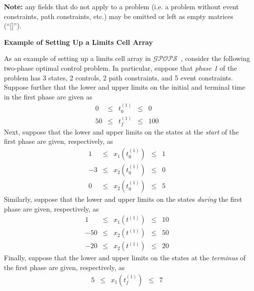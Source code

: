 \documentclass[10pt,final]{report}
\newcommand{\gpops}{$\mathcal{GPOPS}$~}
\newcounter{example}[chapter]
\newenvironment{shadedframe}{%
  \def\FrameCommand{\fcolorbox{black}{shadecolor}}%
  \MakeFramed {\FrameRestore}}
{\endMakeFramed}
\begin{document}
{\noindent}{\bf Note:} any fields that do not apply to a problem (i.e. a problem without event constraints, path constraints, etc.) may be omitted or left as empty matrices (``[]'').

\begin{shadedframe}
{\noindent}{\bf Example of Setting Up a Limits Cell Array}
\vspace{12pt}

As an example of setting up a limits cell array in \gpops,
consider the following two-phase optimal control problem.  In
particular, suppose that {\em phase 1} of the problem has 3 states, 2
controls, 2 path constraints, and 5 event constraints.  Suppose
further that the lower and upper limits on the initial and terminal
time in the first phase are given as
\begin{displaymath}
  \begin{array}{rcccr}
    0 & \leq  & t_0^{(1)} & \leq & 0 \\
    50 & \leq & t_f^{(1)} & \leq & 100
  \end{array}
\end{displaymath}
Next, suppose that the lower and upper limits on the states at the
{\em start} of the first phase are given, respectively, as
\begin{displaymath}
  \begin{array}{rcccr}
    1 & \leq & x_1(t_0^{(1)}) & \leq & 1 \\
    -3 & \leq & x_2(t_0^{(1)}) & \leq & 0 \\
    0 & \leq & x_2(t_0^{(1)}) & \leq & 5
  \end{array}
\end{displaymath}
Similarly, suppose that the lower and upper limits on the states
{\em during}  the first phase are given, respectively, as
\begin{displaymath}
  \begin{array}{rcccr}
    1 & \leq & x_1(t^{(1)}) & \leq & 10 \\
    -50 & \leq & x_2(t^{(1)}) & \leq & 50 \\
    -20 & \leq & x_2(t^{(1)}) & \leq & 20
  \end{array}
\end{displaymath}
Finally, suppose that the lower and upper limits on the states at the
{\em terminus} of the first phase are given, respectively, as
\begin{displaymath}
  \begin{array}{rcccr}
    5 & \leq & x_1(t_f^{(1)}) & \leq & 7 \\

\end{array}
\end{displaymath}
\end{shadedframe}
\end{document}
